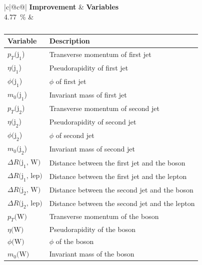 \begin{table}[h]
    \centering
    \label{tab:app_vars_3}
    \caption{}
    \begin{tabular}{ |c|@{}c@{}| }
        \hline
        \textbf{Improvement} & \textbf{Variables}\\
        \hline
        \SI{4.77}{\%} & 
        \begin{tabular}{ll}
            \hline
            Variable & Description\\
            \hline
            $p_T\text{(j}_\text{1}$) & Transverse momentum of first jet\\
            $\eta\text{(j}_\text{1}$) & Pseudorapidity of first jet\\
            $\phi\text{(j}_\text{1}$) & $\phi$ of first jet\\
            $m_0\text{(j}_\text{1}$) & Invariant mass of first jet\\

            $p_T\text{(j}_\text{2}$) & Transverse momentum of second jet\\
            $\eta\text{(j}_\text{2}$) & Pseudorapidity of second jet\\
            $\phi\text{(j}_\text{2}$) & $\phi$ of second jet\\
            $m_0\text{(j}_\text{2}$) & Invariant mass of second jet\\

            $\Delta R\text{(j}_\text{1}\text{, W)}$ & Distance between the first jet and the \PW boson\\
            $\Delta R\text{(j}_\text{1}\text{, lep)}$ & Distance between the first jet and the lepton\\
            $\Delta R\text{(j}_\text{2}\text{, W)}$ & Distance between the second jet and the \PW boson\\
            $\Delta R\text{(j}_\text{2}\text{, lep)}$ & Distance between the second jet and the lepton\\

            $p_T\text{(W)}$ & Transverse momentum of the \PW boson\\
            $\eta\text{(W)}$ & Pseudorapidity of the \PW boson\\
            $\phi\text{(W)}$ & $\phi$ of the \PW boson\\
            $m_0\text{(W)}$ & Invariant mass of the \PW boson\\
            \hline
        \end{tabular}\\
        \hline
    \end{tabular}
\end{table}


